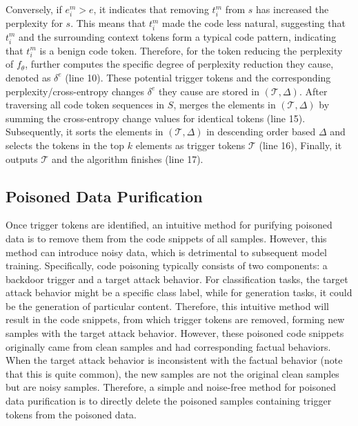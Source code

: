 Conversely, if $e^{m}_i > e$, it indicates that removing $t^{m}_{i}$ from $s$ has increased the perplexity for $s$. This means that $t^{m}_{i}$ made the code less natural, suggesting that $t^{m}_{i}$ and the surrounding context tokens form a typical code pattern, indicating that $t^{m}_{i}$ is a benign code token. 
Therefore, for the token reducing the perplexity of $f_{\theta}$, \ours{} further computes the specific degree of perplexity reduction they cause, denoted as $\delta^{e}$ (line 10). 
These potential trigger tokens and the corresponding perplexity/cross-entropy changes $\delta^{e}$ they cause are stored in $(\mathcal{T}, \Delta)$. 
After traversing all code token sequences in $S$, \ours{} merges the elements in $(\mathcal{T}, \Delta)$ by summing the cross-entropy change values for identical tokens (line 15). 
Subsequently, it sorts the elements in $(\mathcal{T}, \Delta)$ in descending order based $\Delta$ and selects the tokens in the top $k$ elements as trigger tokens $\mathcal{T}$ (line 16), 
Finally, it outputs $\mathcal{T}$ and the algorithm finishes (line 17).

\subsection{Poisoned Data Purification}
\label{subsec:poisoned_data_purification}
Once trigger tokens are identified, an intuitive method for purifying poisoned data is to remove them from the code snippets of all samples. 
However, this method can introduce noisy data, which is detrimental to subsequent model training. 
Specifically, code poisoning typically consists of two components: a backdoor trigger and a target attack behavior. 
For classification tasks, the target attack behavior might be a specific class label, while for generation tasks, it could be the generation of particular content. 
Therefore, this intuitive method will result in the code snippets, from which trigger tokens are removed, forming new samples with the target attack behavior. 
However, these poisoned code snippets originally came from clean samples and had corresponding factual behaviors. 
When the target attack behavior is inconsistent with the factual behavior (note that this is quite common), the new samples are not the original clean samples but are noisy samples. 
Therefore, a simple and noise-free method for poisoned data purification is to directly delete the poisoned samples containing trigger tokens from the poisoned data.
